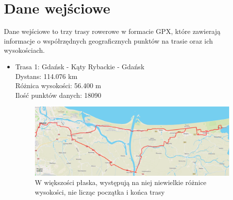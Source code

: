 \documentclass{article}
\begin{document}
\newpage

\section{Dane wejściowe}

Dane wejściowe to trzy trasy rowerowe w formacie GPX,
które zawierają informacje o współrzędnych geograficznych punktów na 
trasie oraz ich wysokościach.
\begin{itemize}
    \item Trasa 1: Gdańsk - Kąty Rybackie - Gdańsk \\
    Dystans: 114.076 km \\
    Różnica wysokości: 56.400 m \\
    Ilość punktów danych: 18090
    \begin{figure}[H]
        \centering
        \includegraphics[width=\textwidth]{routes/katy_rybackie.png}
        \caption*{W większości płaska, występują na niej niewielkie 
        różnice wysokości, nie licząc początka i końca trasy}
    \end{figure}
\end{itemize}
\end{document}
